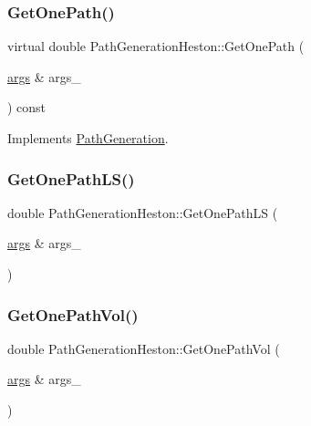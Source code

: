 \subsubsection{\texorpdfstring{Get\+One\+Path()}{GetOnePath()}}
{\footnotesize\ttfamily virtual double Path\+Generation\+Heston\+::\+Get\+One\+Path (\begin{DoxyParamCaption}\item[{\hyperlink{path__generation_8h_a75c13cde2074f502cc4348c70528572d}{args} \&}]{args\+\_\+ }\end{DoxyParamCaption}) const\hspace{0.3cm}{\ttfamily [virtual]}}



Implements \hyperlink{classPathGeneration_a9a64a37f4dd9b2b3ef84f3cb66aed843}{Path\+Generation}.

\hypertarget{classPathGenerationHeston_aacbd76b2461e546faf0e3d5bdd9988ab}{}\label{classPathGenerationHeston_aacbd76b2461e546faf0e3d5bdd9988ab} 
\subsubsection{\texorpdfstring{Get\+One\+Path\+L\+S()}{GetOnePathLS()}}
{\footnotesize\ttfamily double Path\+Generation\+Heston\+::\+Get\+One\+Path\+LS (\begin{DoxyParamCaption}\item[{\hyperlink{path__generation_8h_a75c13cde2074f502cc4348c70528572d}{args} \&}]{args\+\_\+ }\end{DoxyParamCaption})}

\hypertarget{classPathGenerationHeston_ad85097810cfc672f6250e4c8fa39ee75}{}\label{classPathGenerationHeston_ad85097810cfc672f6250e4c8fa39ee75} 
\subsubsection{\texorpdfstring{Get\+One\+Path\+Vol()}{GetOnePathVol()}}
{\footnotesize\ttfamily double Path\+Generation\+Heston\+::\+Get\+One\+Path\+Vol (\begin{DoxyParamCaption}\item[{\hyperlink{path__generation_8h_a75c13cde2074f502cc4348c70528572d}{args} \&}]{args\+\_\+ }\end{DoxyParamCaption})}

